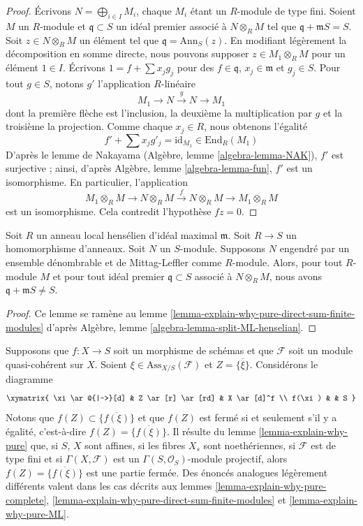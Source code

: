 \begin{proof}
Écrivons $N = \bigoplus_{i \in I} M_i$, chaque $M_i$ étant un $R$-module de type fini.
Soient $M$ un $R$-module et $\mathfrak q \subset S$ un idéal premier
associé à $N \otimes_R M$ tel que $\mathfrak q + \mathfrak m S = S$. Soit
$z \in N \otimes_R M$ un élément tel que $\mathfrak q = \text{Ann}_S(z)$.
En modifiant légèrement la décomposition en somme directe, nous pouvons supposer
$z \in M_1 \otimes_R M$ pour un élément $1 \in I$. Écrivons
$1 = f + \sum x_j g_j$ pour des $f \in \mathfrak q$, $x_j \in \mathfrak m$
et $g_j \in S$. Pour tout $g \in S$, notons $g'$ l'application $R$-linéaire
$$
M_1 \to N \xrightarrow{g} N \to M_1
$$
dont la première flèche est l'inclusion, la deuxième la multiplication
par $g$ et la troisième la projection. Comme chaque $x_j \in R$,
nous obtenons l'égalité
$$
f' + \sum x_j g'_j = \text{id}_{M_1} \in \text{End}_R(M_1)
$$
D'après le lemme de Nakayama
(Algèbre, lemme \ref{algebra-lemma-NAK}),
$f'$ est surjective ; ainsi, d'après
Algèbre, lemme \ref{algebra-lemma-fun},
$f'$ est un isomorphisme. En particulier, l'application
$$
M_1 \otimes_R M \to N \otimes_R M \xrightarrow{f} N \otimes_R M
\to M_1 \otimes_R M
$$
est un isomorphisme. Cela contredit l'hypothèse $fz = 0$.
\end{proof}

\begin{lemma}
\label{lemma-explain-why-pure-ML}
Soit $R$ un anneau local hensélien d'idéal maximal $\mathfrak m$.
Soit $R \to S$ un homomorphisme d'anneaux. Soit $N$ un $S$-module.
Supposons $N$ engendré par un ensemble dénombrable et de Mittag-Leffler comme $R$-module.
Alors, pour tout $R$-module $M$ et pour tout idéal premier $\mathfrak q \subset S$
associé à $N \otimes_R M$, nous avons
$\mathfrak q + \mathfrak m S \not = S$.
\end{lemma}

\begin{proof}
Ce lemme se ramène au
lemme \ref{lemma-explain-why-pure-direct-sum-finite-modules}
d'après
Algèbre, lemme \ref{algebra-lemma-split-ML-henselian}.
\end{proof}

\noindent
Supposons que $f : X \to S$ soit un morphisme de schémas et que
$\mathcal{F}$ soit un module quasi-cohérent sur $X$.
Soient $\xi \in \text{Ass}_{X/S}(\mathcal{F})$ et $Z = \overline{\{\xi\}}$.
Considérons le diagramme
$$
\xymatrix{
\xi \ar@{|->}[d] & Z \ar[r] \ar[rd] & X \ar[d]^f \\
f(\xi) & & S
}
$$
Notons que $f(Z) \subset \overline{\{f(\xi)\}}$ et que $f(Z)$ est fermé
si et seulement s'il y a égalité, c'est-à-dire $f(Z) = \overline{\{f(\xi)\}}$.
Il résulte du
lemme \ref{lemma-explain-why-pure}
que, si $S$, $X$ sont affines, si les fibres $X_s$ sont noethériennes,
si $\mathcal{F}$ est de type fini et si $\Gamma(X, \mathcal{F})$
est un $\Gamma(S, \mathcal{O}_S)$-module projectif, alors
$f(Z) = \overline{\{f(\xi)\}}$ est une partie fermée.
Des énoncés analogues légèrement différents valent dans les cas décrits aux
lemmes \ref{lemma-explain-why-pure-complete},
\ref{lemma-explain-why-pure-direct-sum-finite-modules} et
\ref{lemma-explain-why-pure-ML}.




